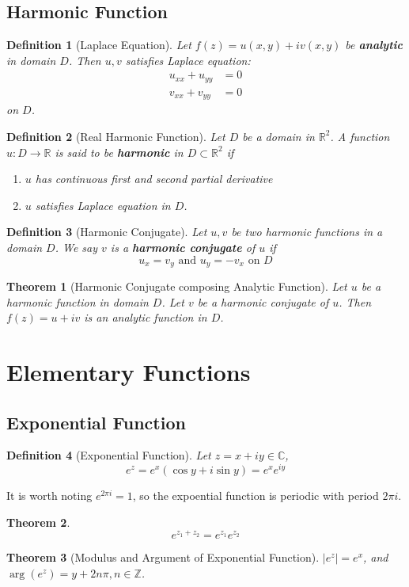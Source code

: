 \documentclass[12pt]{article}
\newtheorem{definition}{Definition}[section]
\newtheorem{theorem}{Theorem}[section]
\theoremstyle{definition}
\begin{document}
\subsection{Harmonic Function}
\begin{definition}[Laplace Equation]
\normalfont Let $f(z)=u(x,y)+iv(x,y)$ be \textbf{analytic} in domain $D$. Then $u, v$ satisfies Laplace equation:
\begin{align*}
u_{xx}+u_{yy}&=0\\
v_{xx}+v_{yy}&=0
\end{align*}
on $D$.
\end{definition}
\begin{definition}[Real Harmonic Function]
\normalfont Let $D$ be a domain in $\mathbb{R}^2$. A function $u:D\to\mathbb{R}$ is said to be \textbf{harmonic} in $D\subset \mathbb{R}^2$ if
\begin{enumerate}
	\item $u$ has continuous first and second partial derivative
	\item $u$ satisfies Laplace equation in $D$.
\end{enumerate}
\end{definition}
\begin{definition}[Harmonic Conjugate]
\normalfont Let $u,v$ be two harmonic functions in a domain $D$. We say $v$ is a \textbf{harmonic conjugate} of $u$ if
\[
u_x=v_y\text{  and  }u_y=-v_x\text{  on }D
\]
\end{definition}
\begin{theorem}[Harmonic Conjugate composing Analytic Function]
\normalfont Let $u$ be a harmonic function in domain $D$. Let $v$ be a harmonic conjugate of $u$. Then $f(z)=u+iv$ is an analytic function in $D$.
\end{theorem}
\section{Elementary Functions}
\subsection{Exponential Function}
\begin{definition}[Exponential Function]
\normalfont Let $z=x+iy\in \mathbb{C}$,
\[
e^z = e^x(\cos y + i\sin y) = e^x e^{iy}
\]
\end{definition}
It is worth noting $e^{2\pi i} = 1$, so the expoential function is periodic with period $2\pi i$.\\
\begin{theorem}\[e^{z_1+z_2}=e^{z_1}e^{z_2}\]\end{theorem}
\begin{theorem}[Modulus and Argument of Exponential Function]
\normalfont $|e^z|=e^x$, and $\arg(e^z)=y+2n\pi, n\in \mathbb{Z}$.
\end{theorem}
\end{document}

